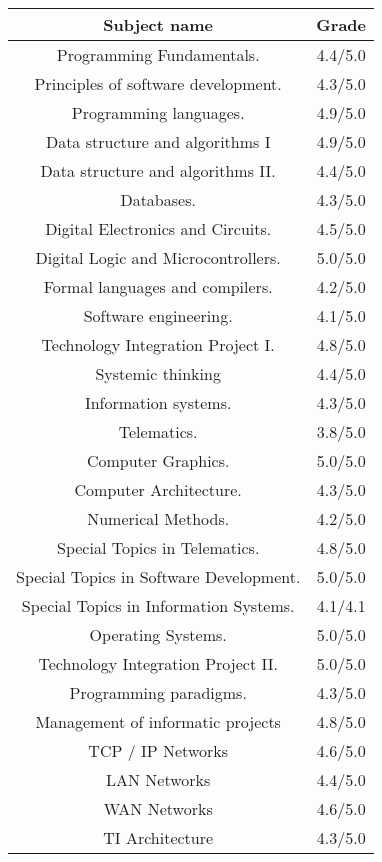 \documentclass[a4paper,10pt]{article} %
\begin{document}
\begin {center}
\begin{tabular}{| c | c |}
 \hline
 \textbf{Subject name} & \textbf{Grade}\\ \hline
Programming Fundamentals. & 4.4/5.0\\
Principles of software development. & 4.3/5.0\\
Programming languages.  & 4.9/5.0\\
Data structure and algorithms I  & 4.9/5.0\\
Data structure and algorithms II. & 4.4/5.0\\
Databases.  & 4.3/5.0\\
Digital Electronics and Circuits.  & 4.5/5.0\\
Digital Logic and Microcontrollers.  & 5.0/5.0\\
Formal languages and compilers.  & 4.2/5.0\\
Software engineering.  & 4.1/5.0\\
Technology Integration Project I.  & 4.8/5.0\\
Systemic thinking  & 4.4/5.0\\
Information systems.  & 4.3/5.0\\
Telematics. & 3.8/5.0\\
Computer Graphics.  & 5.0/5.0\\
Computer Architecture. & 4.3/5.0\\
Numerical Methods. & 4.2/5.0\\
Special Topics in Telematics. & 4.8/5.0\\
Special Topics in Software Development. & 5.0/5.0\\
Special Topics in Information Systems. & 4.1/4.1\\
Operating Systems. & 5.0/5.0\\
Technology Integration Project II. & 5.0/5.0\\
Programming paradigms. & 4.3/5.0\\
Management of informatic projects & 4.8/5.0\\
TCP / IP Networks & 4.6/5.0\\
LAN Networks & 4.4/5.0\\
WAN Networks & 4.6/5.0\\
TI Architecture & 4.3/5.0\\
\hline
\end{tabular}
\end{center}
\end{document}

